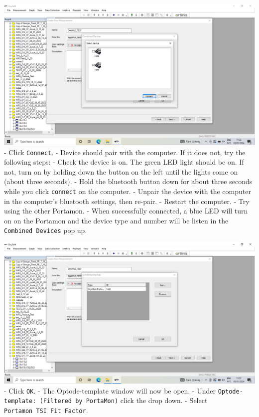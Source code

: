 \documentclass[
]{book}
\begin{document}
\includegraphics[width=1\linewidth]{images/startnewmeasurement/08_device_number}
- Click \texttt{Connect}.
- Device should pair with the computer. If it does not, try the following steps:
- Check the device is on. The green LED light should be on. If not, turn on by holding down the button on the left until the lights come on (about three seconds).
- Hold the bluetooth button down for about three seconds while you click \texttt{connect} on the computer.
- Unpair the device with the computer in the computer's bluetooth settings, then re-pair.
- Restart the computer.
- Try using the other Portamon.
- When successfully connected, a blue LED will turn on on the Portamon and the device type and number will be listen in the \texttt{Combined\ Devices} pop up.

\includegraphics[width=1\linewidth]{images/startnewmeasurement/09_successful_connection}
- Click \texttt{OK}.
- The Optode-template window will now be open.
- Under \texttt{Optode-template:\ (Filtered\ by\ PortaMon)} click the drop down.
- Select \texttt{Portamon\ TSI\ Fit\ Factor}.
\end{document}
